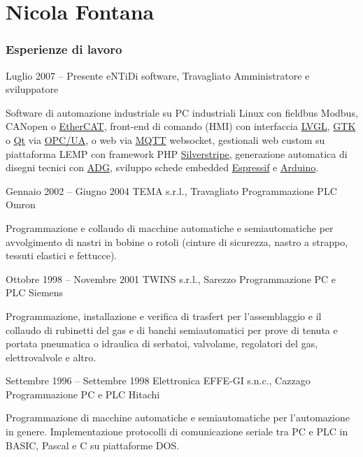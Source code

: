 \documentclass[fontsize=10pt]{tccv}
\begin{document}
\part{Nicola Fontana}

\section{Esperienze di lavoro}

\begin{eventlist}

\item{Luglio 2007 -- Presente}
     {eNTiDi software, Travagliato}
     {Amministratore e sviluppatore}

Software di automazione industriale su PC industriali Linux con fieldbus
Modbus, CANopen o \href{https://etherlab.org}{EtherCAT}, front-end di
comando (HMI) con interfaccia \href{https://lvgl.io}{LVGL},
\href{https://www.gtk.org/}{GTK} o \href{https://www.qt.io}{Qt} via
\href{https://open62541.org/}{OPC/UA}, o web via
\href{https://mqtt.org}{MQTT} websocket, gestionali web custom su
piattaforma LEMP con framework PHP
\href{https://www.silverstripe.org/}{Silverstripe},
generazione automatica di disegni tecnici con
\href{https://adg.entidi.com}{ADG}, sviluppo schede embedded
\href{https://docs.espressif.com/projects/esp-idf}{Espressif} e
\href{https://www.arduino.cc}{Arduino}.

\item{Gennaio 2002 -- Giugno 2004}
     {TEMA s.r.l., Travagliato}
     {Programmazione PLC Omron}

Programmazione e collaudo di macchine automatiche e semiautomatiche per
avvolgimento di nastri in bobine o rotoli (cinture di sicurezza, nastro
a strappo, tessuti elastici e fettucce).

\item{Ottobre 1998 -- Novembre 2001}
     {TWINS s.r.l., Sarezzo}
     {Programmazione PC e PLC Siemens}

Programmazione, installazione e verifica di trasfert per l'assemblaggio
e il collaudo di rubinetti del gas e di banchi semiautomatici per
prove di tenuta e portata pneumatica o idraulica di serbatoi, valvolame,
regolatori del gas, elettrovalvole e altro.

\item{Settembre 1996 -- Settembre 1998}
     {Elettronica EFFE-GI s.n.c., Cazzago}
     {Programmazione PC e PLC Hitachi}

Programmazione di macchine automatiche e semiautomatiche per
l'automazione in genere. Implementazione protocolli di comunicazione
seriale tra PC e PLC in BASIC, Pascal e C su piattaforme DOS.


\end{eventlist}
\end{document}
